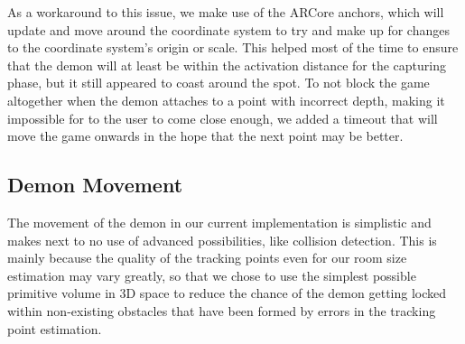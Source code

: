 As a workaround to this issue, we make use of the ARCore anchors, which will update and move around the coordinate system to try and make up for changes to the coordinate system's origin or scale.
This helped most of the time to ensure that the demon will at least be within the activation distance for the capturing phase, but it still appeared to coast around the spot.
To not block the game altogether when the demon attaches to a point with incorrect depth, making it impossible for to the user to come close enough, we added a timeout that will move the game onwards in the hope that the next point may be better.

\subsection{Demon Movement}
The movement of the demon in our current implementation is simplistic and makes next to no use of advanced possibilities, like collision detection.
This is mainly because the quality of the tracking points even for our room size estimation may vary greatly, so that we chose to use the simplest possible primitive volume in 3D space to reduce the chance of the demon getting locked within non-existing obstacles that have been formed by errors in the tracking point estimation.

